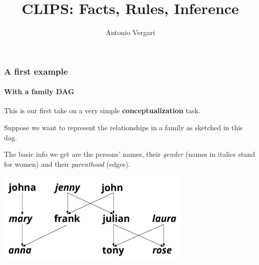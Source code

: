 \documentclass[xcolor={usenames,dvipsnames,svgnames}, compress]{beamer}
\begin{document}
\title{CLIPS: Facts, Rules, Inference}
\author{Antonio Vergari}

\footnotesize \let\small\footnotesize

{
  \begin{frame}
    \titlepage
  \end{frame}
}



\begin{frame}
  \frametitle{A first example}
  \framesubtitle{With a family DAG}
  This is our first take on a very simple \textbf{conceptualization}
  task.\par
  Suppose we want to represent the relationships in a family as
  sketched in this dag.\par
  The basic info we get are the persons' names,
  their \emph{gender} (names in italics stand for women) and their \emph{parenthood}
  (edges).
  \begin{center}
    \includegraphics[width=0.7\textwidth]{Figures/family_dag}
  \end{center}
  
  
\end{frame}
\end{document}
